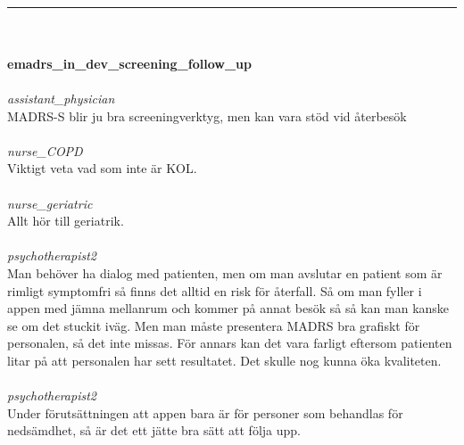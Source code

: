 \documentclass[12pt,a4paper,oneside]{article}
\begin{document}
\ \vspace{.66em}\\
\hrule
\ \vspace{.33em}\\
\ \\{\bf emadrs\_in\_dev\_screening\_follow\_up }
\\\ \\%
 { \it assistant\_physician %
}\\ 
MADRS-S blir ju bra screeningverktyg, men kan vara st{\"o}d vid {\aa}terbes{\"o}k %
\ \\\ \\
 { \it   nurse\_COPD %
}\\ 
Viktigt veta vad som inte {\"a}r KOL. %
\ \\\ \\
 { \it   nurse\_geriatric %
}\\ 
Allt h{\"o}r till geriatrik.  %
\ \\\ \\
 { \it   psychotherapist2 %
}\\ 
Man beh{\"o}ver ha dialog med patienten, men om man avslutar en patient som {\"a}r rimligt symptomfri s{\aa} finns det alltid en risk f{\"o}r {\aa}terfall. S{\aa} om man fyller i appen med j{\"a}mna mellanrum och kommer p{\aa} annat bes{\"o}k s{\aa} s{\aa} kan man kanske se om det stuckit iv{\"a}g. Men man m{\aa}ste presentera MADRS bra grafiskt f{\"o}r personalen, s{\aa} det inte missas. F{\"o}r annars kan det vara farligt eftersom patienten litar p{\aa} att personalen har sett resultatet. Det skulle nog kunna {\"o}ka kvaliteten.  %
\ \\\ \\
 { \it   psychotherapist2 %
}\\ 
Under f{\"o}ruts{\"a}ttningen att appen bara {\"a}r f{\"o}r personer som behandlas f{\"o}r neds{\"a}mdhet, s{\aa} {\"a}r det ett j{\"a}tte bra s{\"a}tt att f{\"o}lja upp. %
\end{document}
